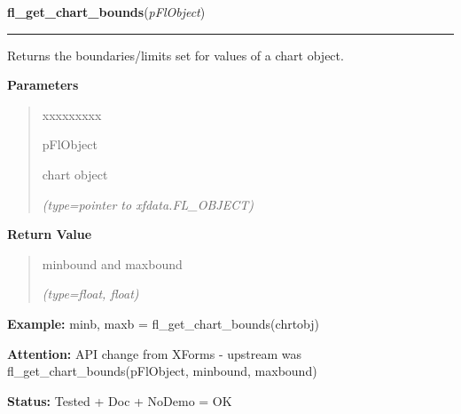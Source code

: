     \label{xformslib:flchart:fl_get_chart_bounds}

    \vspace{0.5ex}

\hspace{.8\funcindent}\begin{boxedminipage}{\funcwidth}

    \raggedright \textbf{fl\_get\_chart\_bounds}(\textit{pFlObject})

    \vspace{-1.5ex}

    \rule{\textwidth}{0.5\fboxrule}
\setlength{\parskip}{2ex}
    Returns the boundaries/limits set for values of a chart object.

\setlength{\parskip}{1ex}
      \textbf{Parameters}
      \vspace{-1ex}

      \begin{quote}
        \begin{Ventry}{xxxxxxxxx}

          \item[pFlObject]

          chart object

            {\it (type=pointer to xfdata.FL\_OBJECT)}

        \end{Ventry}

      \end{quote}

      \textbf{Return Value}
    \vspace{-1ex}

      \begin{quote}
      minbound and maxbound

      {\it (type=float, float)}

      \end{quote}

\textbf{Example:} minb, maxb = fl\_get\_chart\_bounds(chrtobj)



\textbf{Attention:} API change from XForms - upstream was fl\_get\_chart\_bounds(pFlObject, 
minbound, maxbound)



\textbf{Status:} Tested + Doc + NoDemo = OK



    \end{boxedminipage}

